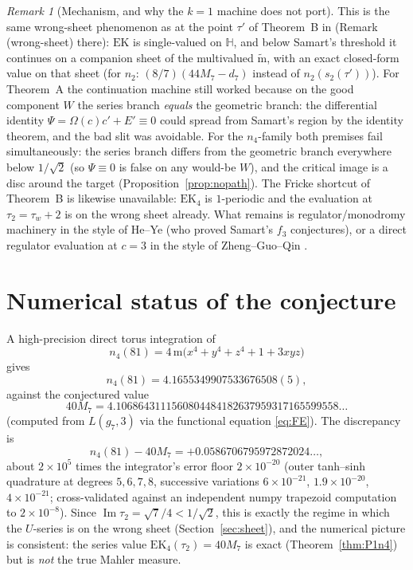 \documentclass[11pt]{article}
\theoremstyle{definition}
\theoremstyle{remark}
\newtheorem{remark}[theorem]{Remark}
\newcommand{\Hh}{\mathbb{H}}
\newcommand{\ImT}{\operatorname{Im}}
\newcommand{\m}{\mathrm{m}}
\newcommand{\mt}{\widetilde{\m}}
\begin{document}
\begin{remark}[Mechanism, and why the $k=1$ machine does not port]
This is the same wrong-sheet phenomenon as at the point $\tau'$ of
Theorem~B in \cite{Zf} (Remark (wrong-sheet) there): $\mathrm{EK}$ is
single-valued on $\Hh$, and below Samart's threshold it continues on a
companion sheet of the multivalued $\mt$, with an exact closed-form
value on that sheet (for $n_2$: $(8/7)(44M_7-d_7)$ instead of
$n_2(s_2(\tau'))$). For Theorem~A the continuation machine still worked
because on the good component $W$ the series branch \emph{equals} the
geometric branch: the differential identity
$\Psi=\Omega(c)c'+E'\equiv0$ could spread from Samart's region by the
identity theorem, and the bad slit was avoidable. For the $n_4$-family
both premises fail simultaneously: the series branch differs from the
geometric branch everywhere below $1/\sqrt2$ (so $\Psi\equiv0$ is false
on any would-be $W$), and the critical image is a disc around the
target (Proposition~\ref{prop:nopath}). The Fricke shortcut of
Theorem~B is likewise unavailable: $\mathrm{EK}_4$ is $1$-periodic and
the evaluation at $\tau_2=\tau_w+2$ is on the wrong sheet already.
What remains is regulator/monodromy machinery in the style of He--Ye
\cite{HY} (who proved Samart's $f_3$ conjectures), or a direct regulator
evaluation at $c=3$ in the style of Zheng--Guo--Qin \cite{ZGQ}.
\end{remark}

\section{Numerical status of the conjecture}\label{sec:numerics}

\noindent A high-precision direct torus integration of
\[
  n_4(81)=4\,\m\bigl(x^4+y^4+z^4+1+3xyz\bigr)
\]
gives
\[
  n_4(81)=4.1655349907533676508(5),
\]
against the conjectured value
\[
  40M_7=4.1068643111560804484182637959317165599558\ldots
\]
(computed from $L(g_7,3)$ via the functional equation \eqref{eq:FE}).
The discrepancy is
\[
  n_4(81)-40M_7=+0.0586706795972872024\ldots,
\]
about $2\times10^{5}$ times the integrator's error floor
$2\times10^{-20}$ (outer tanh--sinh quadrature at degrees $5,6,7,8$,
successive variations $6\times10^{-21}$, $1.9\times10^{-20}$,
$4\times10^{-21}$; cross-validated against an independent numpy
trapezoid computation to $2\times10^{-8}$). Since $\ImT\tau_2
=\sqrt7/4<1/\sqrt2$, this is exactly the regime in which the $U$-series
is on the wrong sheet (Section~\ref{sec:sheet}), and the numerical
picture is consistent: the series value $\mathrm{EK}_4(\tau_2)=40M_7$
is exact (Theorem~\ref{thm:P1n4}) but is \emph{not} the true Mahler
measure.
\end{document}
